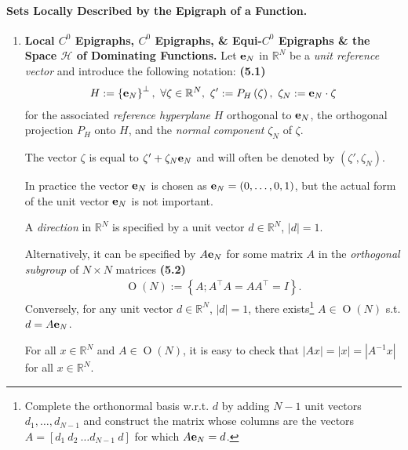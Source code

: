 \documentclass{book}
\numberwithin{equation}{section}
\begin{document}
\paragraph{Sets Locally Described by the Epigraph of a Function.}
\begin{enumerate}
    \item \textbf{Local $C^0$ Epigraphs, $C^0$ Epigraphs, \& Equi-$C^0$ Epigraphs \& the Space $\mathcal{H}$ of Dominating Functions.} Let ${\bf e}_N$ in $\mathbb{R}^N$ be a \textit{unit reference vector} and introduce the following notation: \textbf{(5.1)}
    \begin{align*}
        H := \left\{{\bf e}_N\right\}^\bot,\ \forall\zeta\in\mathbb{R}^N,\ \zeta' := P_H\left(\zeta\right),\ \zeta_N := {\bf e}_N\cdot\zeta
    \end{align*}
    for the associated \textit{reference hyperplane} $H$ orthogonal to ${\bf e}_N$, the orthogonal projection $P_H$ onto $H$, and the \textit{normal component} $\zeta_N$ of $\zeta$.
    
    The vector $\zeta$ is equal to $\zeta' + \zeta_N{\bf e}_N$ and will often be denoted by $\left(\zeta',\zeta_N\right)$.
    
    In practice the vector ${\bf e}_N$ is chosen as ${\bf e}_N = (0,\ldots,0,1)$, but the actual form of the unit vector ${\bf e}_N$ is not important.
    
    A \textit{direction} in $\mathbb{R}^N$ is specified by a unit vector $d\in\mathbb{R}^N$, $|d| = 1$.
    
    Alternatively, it can be specified by $A{\bf e}_N$ for some matrix $A$ in the \textit{orthogonal subgroup} of $N\times N$ matrices \textbf{(5.2)}
    \begin{align*}
        \operatorname{O}(N) := \left\{A;A^\top A = AA^\top = I\right\}.
    \end{align*}
    Conversely, for any unit vector $d\in\mathbb{R}^N$, $|d| = 1$, there exists\footnote{Complete the orthonormal basis w.r.t. $d$ by adding $N - 1$ unit vectors $d_1,\ldots,d_{N-1}$ and construct the matrix whose columns are the vectors $A = \left[d_1\ d_2\ \ldots d_{N-1}\ d\right]$ for which $A{\bf e}_N = d$.} $A\in\operatorname{O}(N)$ s.t. $d = A{\bf e}_N$.
    
    For all $x\in\mathbb{R}^N$ and $A\in\operatorname{O}(N)$, it is easy to check that $|Ax| = |x| = |A^{-1}x|$ for all $x\in\mathbb{R}^N$.
    

\end{enumerate}
\end{document}
